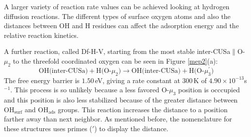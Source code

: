 \documentclass[11pt,DIV=13,BCOR=5mm,a4paper,headinclude]{scrbook}
\begin{document}
A larger variety of reaction rate values can be achieved looking at hydrogen diffusion reactions.
The different types of surface oxygen atoms and also the distances between OH and H residues can affect the adsorption energy and the relative reaction kinetics.


A further reaction, called Df-H-V, starting from the most stable inter-CUSa$\parallel$O-$\mu_2$ to the threefold coordinated oxygen can be seen in Figure \ref{mep2}(a):
\begin{equation}
 \text{OH(inter-CUSa)} + \text{H(O-$\mu_2$)} \rightarrow \text{OH(inter-CUSa)} + \text{H(O-$\mu_3^\prime$)} \tag{Df-H-V}
     \label{diffHb}
\end{equation}
The free energy barrier is $1.50\,$eV, giving a rate constant at $300\,$K of $4.90\times 10^{-13}$s$^{-1}$.
This process is so unlikely because a less favored O-$\mu_3$ position is occcupied and this position is also less stabilized because of the greater distance between OH$_{\text{surf}}$ and OH$_{\text{ads}}$ groups.
This reaction increases the distance to a position farther away than next neighbor.
As mentioned before, the nomenclature for these structures uses primes ($\prime$) to display the distance.


\end{document}
